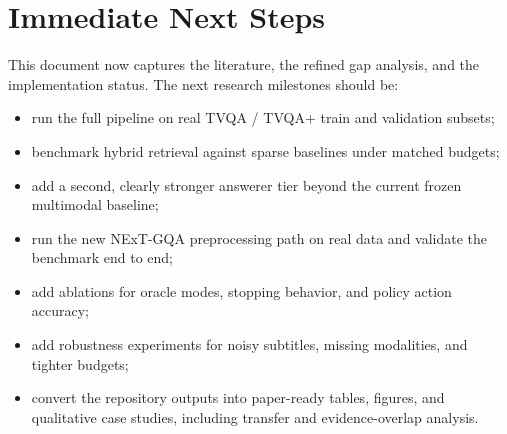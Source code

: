 \documentclass{article}
\begin{document}
\section{Immediate Next Steps}
This document now captures the literature, the refined gap analysis, and the implementation status.
The next research milestones should be:

\begin{itemize}
  \item run the full pipeline on real TVQA / TVQA+ train and validation subsets;
  \item benchmark hybrid retrieval against sparse baselines under matched budgets;
  \item add a second, clearly stronger answerer tier beyond the current frozen multimodal baseline;
  \item run the new NExT-GQA preprocessing path on real data and validate the benchmark end to end;
  \item add ablations for oracle modes, stopping behavior, and policy action accuracy;
  \item add robustness experiments for noisy subtitles, missing modalities, and tighter budgets;
  \item convert the repository outputs into paper-ready tables, figures, and qualitative case studies, including transfer and evidence-overlap analysis.
\end{itemize}



\end{document}
